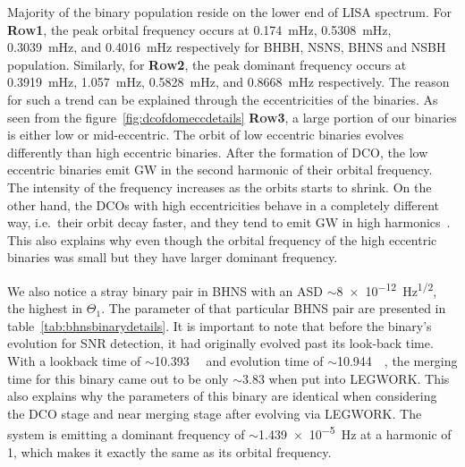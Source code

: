 \documentclass[journal, twocolumns]{IEEEtran}
\newcommand{\scientific}[2]{\SI[scientific-notation=engineering, exponent-to-prefix]{#1}{#2}}
\begin{document}
    Majority of the binary population reside on the lower end of LISA spectrum.
    For \textsc{\textbf{Row1}}, the peak orbital frequency occurs at \SI{0.174}{\milli\hertz}, \SI{0.5308}{\milli\hertz}, \SI{0.3039}{\milli\hertz}, and \SI{0.4016}{\milli\hertz} respectively for BHBH, NSNS, BHNS and NSBH population.
    Similarly, for \textsc{\textbf{Row2}}, the peak dominant frequency occurs at \SI{0.3919}{\milli\hertz}, \SI{1.057}{\milli\hertz}, \SI{0.5828}{\milli\hertz}, and \SI{0.8668}{\milli\hertz} respectively.
    The reason for such a trend can be explained through the eccentricities of the binaries.
    As seen from the figure~\ref{fig:dcofdomeccdetails} \textsc{\textbf{Row3}}, a large portion of our binaries is either low or mid-eccentric.
    The orbit of low eccentric binaries evolves differently than high eccentric binaries.
    After the formation of DCO, the low eccentric binaries emit GW in the second harmonic of their orbital frequency.
    The intensity of the frequency increases as the orbits starts to shrink.
    On the other hand, the DCOs with high eccentricities behave in a completely different way, i.e.\ their orbit decay faster, and they tend to emit GW in high harmonics~\cite{Peters1963, Peters1964}.
    This also explains why even though the orbital frequency of the high eccentric binaries was small but they have larger dominant frequency.

    We also notice a stray binary pair in BHNS with an ASD $\sim$\SI{8e-12}{\hertz\tothe{1/2}}, the highest in $\Theta_1$.
    The parameter of that particular BHNS pair are presented in table~\ref{tab:bhnsbinarydetails}.
    It is important to note that before the binary's evolution for SNR detection, it had originally evolved past its look-back time.
    With a lookback time of $\sim$\scientific{10.393}{\mega\yr} and evolution time of $\sim$\scientific{10.944}{\mega\yr}, the merging time for this binary came out to be only $\sim$\scientific{3.83}{\yr} when put into LEGWORK\@.
    This also explains why the parameters of this binary are identical when considering the DCO stage and near merging stage after evolving via LEGWORK\@.
    The system is emitting a dominant frequency of $\sim$\SI{1.439e-5}{\hertz} at a harmonic of 1, which makes it exactly the same as its orbital frequency.
\end{document}
